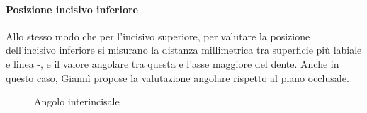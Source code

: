 \paragraph{Posizione incisivo inferiore}
Allo stesso modo che per l'incisivo superiore, per valutare la posizione dell'incisivo inferiore si misurano la distanza millimetrica tra superficie più labiale e linea -, e il valore angolare tra questa e l'asse maggiore del dente. Anche in questo caso, Giannì propose la valutazione angolare rispetto al piano occlusale.

\begin{figure}[!p]
\centering
\begin{minipage}{.44\textwidth}
 \centering
 \caption{Angolo interincisale}
 \label{fig:steiner_interincisale}
\end{minipage}\quad\quad
\begin{minipage}{.44\textwidth}
 \centering

\end{minipage}
\end{figure}
